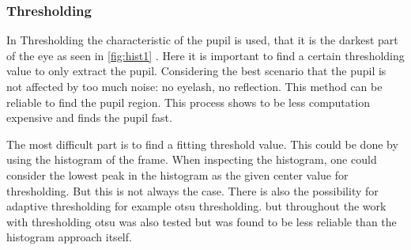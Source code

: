 \subsubsection{Thresholding}
In Thresholding the characteristic of the pupil is used, that it is the darkest part of the eye as seen in \ref{fig:hist1} . Here it is important to find a certain thresholding value to only extract the pupil. Considering the best scenario that the pupil is not affected by too much noise: no eyelash, no reflection. This method can be reliable to find the pupil region. This process shows to be less computation expensive and finds the pupil fast. 

The most difficult part is to find a fitting threshold value. This could be done by using the histogram of the frame. When inspecting the histogram, one could consider the lowest peak in the histogram as the given center value for thresholding. But this is not always the case. There is also the possibility for adaptive thresholding for example otsu thresholding. but throughout the work with thresholding otsu was also tested but was found to be less reliable than the histogram approach itself. 

